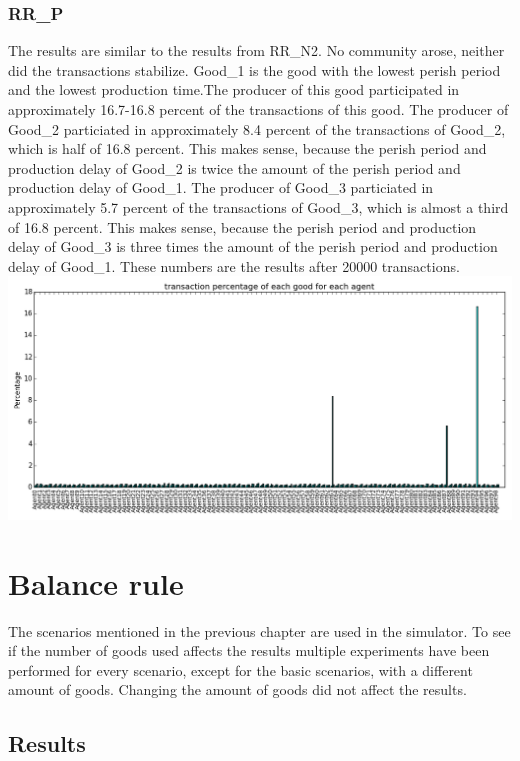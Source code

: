 \documentclass[twoside,openright]{uva-bachelor-thesis}
\begin{document}
\subsubsection{RR\_P}
The results are similar to the results from RR\_N2. No community arose, neither did the transactions stabilize. Good\_1 is the good with the lowest perish period and the lowest production time.The producer of this good participated in approximately 16.7-16.8 percent of the transactions of this good. The producer of Good\_2 particiated in approximately 8.4 percent of the transactions of Good\_2, which is half of 16.8 percent. This makes sense, because the perish period and production delay of Good\_2 is twice the amount of the perish period and production delay of Good\_1. The producer of Good\_3 particiated in approximately 5.7 percent of the transactions of Good\_3, which is almost a third of 16.8 percent. This makes sense, because the perish period and production delay of Good\_3 is three times the amount of the perish period and production delay of Good\_1. 
These numbers are the results after 20000 transactions. \\
\includegraphics[scale=0.4]{experiment_images/RR_P}

\section{Balance rule}
The scenarios mentioned in the previous chapter are used in the simulator. To see if the number of goods used affects the results multiple experiments have been performed for every scenario, except for the basic scenarios, with a different amount of goods. Changing the amount of goods did not affect the results.
\subsection{Results}
\end{document}
